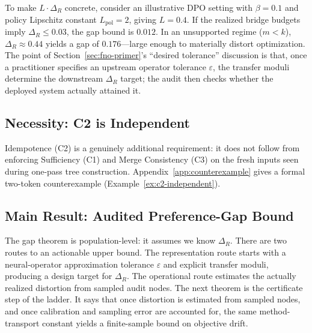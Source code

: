 To make $L \cdot \Delta_R$ concrete, consider an illustrative DPO
setting with $\beta = 0.1$ and policy Lipschitz constant
$L_{\mathrm{pol}} = 2$, giving $L = 0.4$. If the realized bridge
budgets imply $\Delta_R \le 0.03$, the gap bound is $0.012$. In an
unsupported regime ($m < k$), $\Delta_R \approx 0.44$ yields a gap of
$0.176$---large enough to materially distort optimization. The point of
Section~\ref{sec:fno-primer}'s ``desired tolerance'' discussion is that,
once a practitioner specifies an upstream operator tolerance
$\varepsilon$, the transfer moduli determine the downstream
$\Delta_R$ target; the audit then checks whether the deployed system
actually attained it.

\subsection{Necessity: C2 is Independent}

Idempotence (C2) is a genuinely additional requirement: it does not follow from enforcing Sufficiency (C1) and Merge Consistency (C3) on the fresh inputs seen during one-pass tree construction. Appendix~\ref{app:counterexample} gives a formal two-token counterexample (Example~\ref{ex:c2-independent}).

\subsection{Main Result: Audited Preference-Gap Bound}

The gap theorem is population-level: it assumes we know $\Delta_R$. There are two routes to an actionable upper bound. The representation route starts with a neural-operator approximation tolerance $\varepsilon$ and explicit transfer moduli, producing a design target for $\Delta_R$. The operational route estimates the actually realized distortion from sampled audit nodes. The next theorem is the certificate step of the ladder. It says that once distortion is estimated from sampled nodes, and once calibration and sampling error are accounted for, the same method-transport constant yields a finite-sample bound on objective drift.

